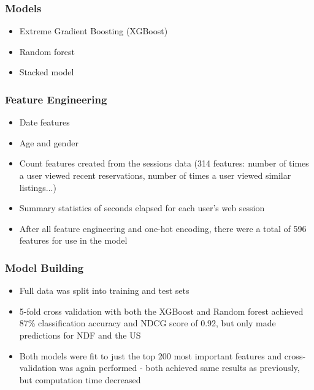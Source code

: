 \documentclass{beamer}
\begin{document}
\begin{frame}
\frametitle{Models}
  \begin{itemize}
    \item Extreme Gradient Boosting (XGBoost)
    \item Random forest
    \item Stacked model
  \end{itemize}
\end{frame}

\begin{frame}
\frametitle{Feature Engineering}
\begin{itemize}
  \item Date features
  \item Age and gender
  \item Count features created from the sessions data (314 features: number of times a user viewed recent reservations, number of times a user viewed similar listings...)
  \item Summary statistics of seconds elapsed for each user’s web session
  \item After all feature engineering and one-hot encoding, there were a total of 596 features for use in the model
\end{itemize}
\end{frame}

\begin{frame}
\frametitle{Model Building}
\begin{itemize}
  \item Full data was split into training and test sets
  \item 5-fold cross validation with both the XGBoost and Random forest achieved 87\% classification accuracy and NDCG score of 0.92, but only made predictions for NDF and the US
  \item Both models were fit to just the top 200 most important features and cross-validation was again performed - both achieved same results as previously, but computation time decreased 
\end{itemize}
\end{frame}
\end{document}
